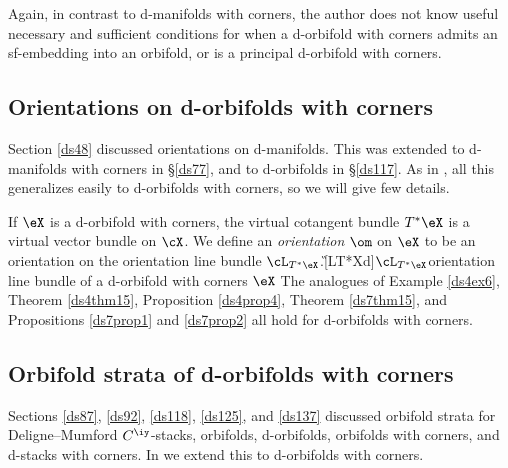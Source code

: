 \documentclass{article}
\begin{document}
Again, in contrast to d-manifolds with corners, the author does not
know useful necessary and sufficient conditions for when a
d-orbifold with corners admits an sf-embedding into an orbifold, or
is a principal d-orbifold with 
corners.

\subsection{Orientations on d-orbifolds with corners}
\label{ds147}

Section \ref{ds48} discussed orientations on d-manifolds. This was
extended to d-manifolds with corners in \S\ref{ds77}, and to
d-orbifolds in \S\ref{ds117}. As in \cite[\S 12.7]{Joyc6}, all this
generalizes easily to d-orbifolds with corners, so we will give few
details.

If $\eX$ is a d-orbifold with corners, the virtual cotangent
bundle $T^*\eX$ is a virtual vector bundle on $\cX$. We define an {\it orientation\/} $\om$ on
$\eX$ to be an orientation on the orientation line
bundle
$\cL_{T^*\eX}$.\G[LT*Xd]{$\cL_{T^*\eX}$}{orientation line bundle of
a d-orbifold with corners $\eX$} The analogues of Example
\ref{ds4ex6}, Theorem \ref{ds4thm15}, Proposition \ref{ds4prop4},
Theorem \ref{ds7thm15}, and Propositions \ref{ds7prop1} and
\ref{ds7prop2} all hold for d-orbifolds with corners.

\subsection{Orbifold strata of d-orbifolds with corners}
\label{ds148}

Sections \ref{ds87}, \ref{ds92}, \ref{ds118}, \ref{ds125}, and
\ref{ds137} discussed orbifold strata for Deligne--Mumford
$C^\iy$-stacks, orbifolds, d-orbifolds, orbifolds with corners, and
d-stacks with corners. In \cite[\S 12.8]{Joyc6} we extend this to
d-orbifolds with corners.
\end{document}
